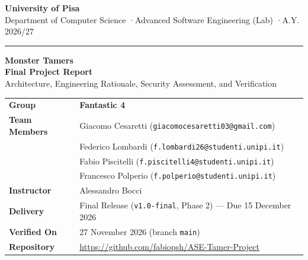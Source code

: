 \documentclass[10.5pt,a4paper]{article}
\DeclareRobustCommand{\code}[1]{\begingroup\def\_{\textunderscore\allowbreak}\texttt{#1}\endgroup}
\begin{document}

\hypersetup{pageanchor=false}
\begin{titlepage}
  \sffamily
  \vspace*{0.6cm}
  {\large\bfseries\color{accent} University of Pisa}\\[0.25em]
  {\normalsize Department of Computer Science \quad·\quad Advanced Software Engineering (Lab) \quad·\quad A.Y. 2026/27}

  \vspace{0.5cm}
  {\color{accent}\rule{\linewidth}{1.2pt}}

  \vspace{2.4cm}
  {\fontsize{34}{40}\selectfont\bfseries\color{accent} Monster Tamers}\\[0.6em]
  {\LARGE\bfseries Final Project Report}\\[0.45em]
  {\large Architecture, Engineering Rationale, Security Assessment, and Verification}

  \vspace{1.6cm}
  \begin{tabularx}{\linewidth}{@{}L{3.6cm}Y@{}}
    \toprule
    \textbf{Group}        & \textbf{Fantastic 4} \\
    \textbf{Team Members} & Giacomo Cesaretti (\code{giacomocesaretti03@gmail.com}) \\
                          & Federico Lombardi (\code{f.lombardi26@studenti.unipi.it}) \\
                          & Fabio Piscitelli (\code{f.piscitelli4@studenti.unipi.it}) \\
                          & Francesco Polperio (\code{f.polperio@studenti.unipi.it}) \\
    \midrule
    \textbf{Instructor}   & Alessandro Bocci \\
    \textbf{Delivery}     & Final Release (\code{v1.0-final}, Phase 2) — Due 15 December 2026 \\
    \textbf{Verified On}  & 27 November 2026 (branch \code{main}) \\
    \textbf{Repository}   & \url{https://github.com/fabiopsh/ASE-Tamer-Project} \\
    \bottomrule
  \end{tabularx}


\end{titlepage}
\end{document}
